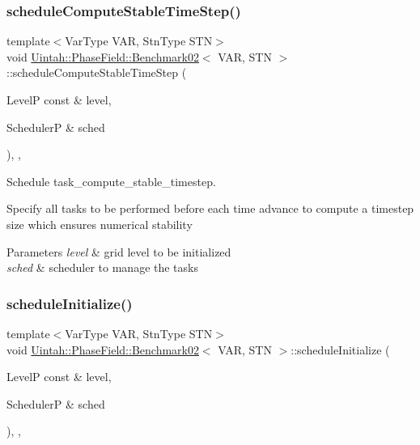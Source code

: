 \subsubsection{\texorpdfstring{schedule\+Compute\+Stable\+Time\+Step()}{scheduleComputeStableTimeStep()}}
{\footnotesize\ttfamily template$<$Var\+Type V\+AR, Stn\+Type S\+TN$>$ \\
void \hyperlink{classUintah_1_1PhaseField_1_1Benchmark02}{Uintah\+::\+Phase\+Field\+::\+Benchmark02}$<$ V\+AR, S\+TN $>$\+::schedule\+Compute\+Stable\+Time\+Step (\begin{DoxyParamCaption}\item[{LevelP const \&}]{level,  }\item[{SchedulerP \&}]{sched }\end{DoxyParamCaption})\hspace{0.3cm}{\ttfamily [override]}, {\ttfamily [protected]}, {\ttfamily [virtual]}}



Schedule task\+\_\+compute\+\_\+stable\+\_\+timestep. 

Specify all tasks to be performed before each time advance to compute a timestep size which ensures numerical stability


\begin{DoxyParams}{Parameters}
{\em level} & grid level to be initialized \\
\hline
{\em sched} & scheduler to manage the tasks \\
\hline
\end{DoxyParams}
\mbox{\label{classUintah_1_1PhaseField_1_1Benchmark02_a883a1f7dfd7461ca274476d06c02b968}} 
\subsubsection{\texorpdfstring{schedule\+Initialize()}{scheduleInitialize()}}
{\footnotesize\ttfamily template$<$Var\+Type V\+AR, Stn\+Type S\+TN$>$ \\
void \hyperlink{classUintah_1_1PhaseField_1_1Benchmark02}{Uintah\+::\+Phase\+Field\+::\+Benchmark02}$<$ V\+AR, S\+TN $>$\+::schedule\+Initialize (\begin{DoxyParamCaption}\item[{LevelP const \&}]{level,  }\item[{SchedulerP \&}]{sched }\end{DoxyParamCaption})\hspace{0.3cm}{\ttfamily [override]}, {\ttfamily [protected]}, {\ttfamily [virtual]}}



